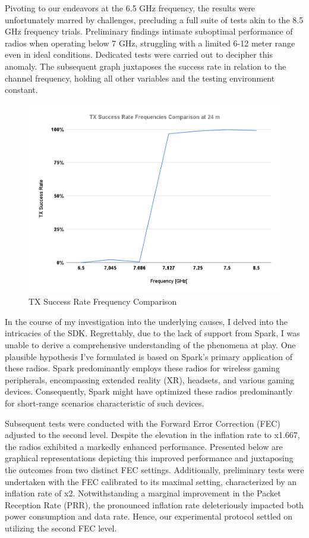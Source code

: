 Pivoting to our endeavors at the 6.5 GHz frequency, the results were unfortunately marred by challenges, precluding a full suite of tests akin to the 8.5 GHz frequency trials. Preliminary findings intimate suboptimal performance of radios when operating below 7 GHz, struggling with a limited 6-12 meter range even in ideal conditions. Dedicated tests were carried out to decipher this anomaly. The subsequent graph juxtaposes the success rate in relation to the channel frequency, holding all other variables and the testing environment constant.

\begin{figure}[h]
\centering
\includegraphics[width=1\textwidth]{images/TX Success Rate Frequencies Comparison at 24 m1.png}
\caption{TX Success Rate Frequency Comparison}
\label{fig:prr_frequency_comparison}
\end{figure}

In the course of my investigation into the underlying causes, I delved into the intricacies of the SDK. Regrettably, due to the lack of support from Spark, I was unable to derive a comprehensive understanding of the phenomena at play. One plausible hypothesis I've formulated is based on Spark's primary application of these radios. Spark predominantly employs these radios for wireless gaming peripherals, encompassing extended reality (XR), headsets, and various gaming devices. Consequently, Spark might have optimized these radios predominantly for short-range scenarios characteristic of such devices.

Subsequent tests were conducted with the Forward Error Correction (FEC) adjusted to the second level. Despite the elevation in the inflation rate to x1.667, the radios exhibited a markedly enhanced performance. Presented below are graphical representations depicting this improved performance and juxtaposing the outcomes from two distinct FEC settings. Additionally, preliminary tests were undertaken with the FEC calibrated to its maximal setting, characterized by an inflation rate of x2. Notwithstanding a marginal improvement in the Packet Reception Rate (PRR), the pronounced inflation rate deleteriously impacted both power consumption and data rate. Hence, our experimental protocol settled on utilizing the second FEC level.

